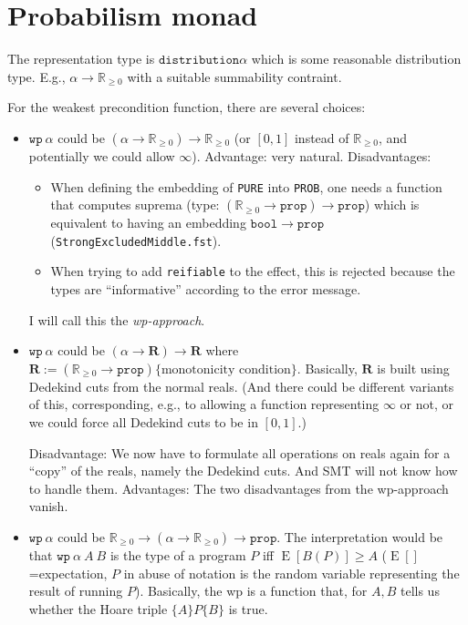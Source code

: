 \documentclass[a4paper]{article}
\newcommand\setR{\mathbb R}
\newcommand\Rpos{\setR_{\geq0}}
\newcommand\prop{\mathtt{prop}}
\renewcommand\wp{\mathtt{wp}}
\newcommand\E{\operatorname E}
\begin{document}
\section{Probabilism monad}

The representation type is $\mathtt{distribution} \alpha$ which is
some reasonable distribution type. E.g., $\alpha\to \Rpos$
with a suitable summability contraint.

For the weakest precondition function, there are several choices:
\begin{itemize}
\item $\mathtt{wp}\ \alpha$ could be
  $(\alpha\to\Rpos)\to \Rpos$ (or $[0,1]$ instead of
  $\Rpos$, and potentially we could allow $\infty$). Advantage: very
  natural. Disadvantages:
  \begin{itemize}
  \item When defining the embedding of \texttt{PURE} into
    \texttt{PROB}, one needs a function that computes suprema (type:
    $(\Rpos\to\prop)\to\prop$) which is equivalent to having an
    embedding $\mathtt{bool}\to\prop$
    (\texttt{StrongExcludedMiddle.fst}).
  \item When trying to add \texttt{reifiable} to the effect, this is
    rejected because the types are ``informative'' according to the
    error message.
  \end{itemize}
  I will call this the \emph{wp-approach}.
\item $\mathtt{wp}\ \alpha$ could be
  $(\alpha\to\mathbf{R})\to \mathbf{R}$ where
  $\mathbf{R} := (\Rpos\to\prop)\{\text{monotonicity condition}\}$.
  Basically, $\mathbf R$ is built using Dedekind cuts from the normal
  reals.  (And there could be different variants of this,
  corresponding, e.g., to allowing a function representing $\infty$ or
  not, or we could force all Dedekind cuts to be in $[0,1]$.)

  Disadvantage: We now have to formulate all operations on reals again
  for a ``copy'' of the reals, namely the Dedekind cuts. And SMT will
  not know how to handle them. Advantages: The two disadvantages from
  the wp-approach vanish.
\item $\mathtt{wp}\ \alpha$ could be
  $\Rpos\to(\alpha\to\Rpos)\to\prop$. The interpretation would be that
  $\wp\ \alpha\ A\ B$ is the type of a program $P$ iff
  $\E[B(P)]\geq A$ ($\E[]$=expectation, $P$ in abuse of notation is
  the random variable representing the result of running $P$).
  Basically, the wp is a function that, for $A,B$ tells us whether the
  Hoare triple $\{A\}P\{B\}$ is true.


\end{itemize}
\end{document}
